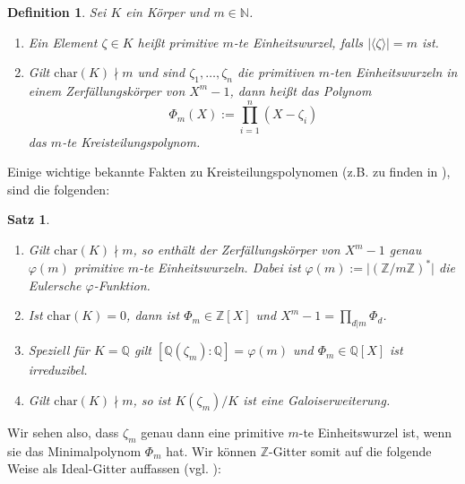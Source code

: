 \documentclass[12pt,a4paper,halfparskip,headsepline,bibtotocnumbered]{scrreprt}
\theoremstyle{nummermitklammern}
\newtheorem{definition}[defsatzusw]{Definition}
\newtheorem{satz}[defsatzusw]{Satz}
\theoremstyle{nonumberbreak}
\newcommand{\N}{\mathbb{N}}
\newcommand{\Z}{\mathbb{Z}}
\newcommand{\Q}{\mathbb{Q}}
\begin{document}
\begin{framed}
	\begin{definition}
		Sei $K$ ein Körper und $m \in \N$. 
		\begin{enumerate}
			\item Ein Element $\zeta \in K$ heißt primitive $m$-te Einheitswurzel, falls $\vert \langle \zeta \rangle \vert = m$ ist.
			\item Gilt $\text{char}(K) \nmid m$ und sind $\zeta_1, \dots, \zeta_n$ die primitiven $m$-ten Einheitswurzeln in einem Zerfällungskörper von $X^m - 1$, dann heißt das Polynom
				\begin{equation*}
					\Phi_m(X) := \prod_{i=1}^n (X - \zeta_i)
				\end{equation*}
				das \textit{$m$-te Kreisteilungspolynom}.
		\end{enumerate}
	\end{definition}
\end{framed}

Einige wichtige bekannte Fakten zu Kreisteilungspolynomen (z.B. zu finden in \cite[Kap. 1]{Mollin}), sind die folgenden:

\begin{framed}
	\begin{satz}\label{th:cycpol}
		\begin{enumerate}[label=(\roman*)]
			\item Gilt $\text{char}(K) \nmid m$, so enthält der Zerfällungskörper von $X^m-1$ genau $\varphi(m)$ primitive $m$-te Einheitswurzeln. Dabei ist $\varphi(m) := \vert \left( \Z / m \Z \right)^\ast \vert$ die \textit{Eulersche $\varphi$-Funktion}.
			\item Ist $\text{char}(K) = 0$, dann ist $\Phi_m \in \Z \left[ X \right]$ und $X^m-1 = \prod_{d \vert m} \Phi_d$.
			\item Speziell für $K = \Q$ gilt $\left[ \Q \left( \zeta_m \right) : \Q \right] = \varphi (m)$ und $\Phi_m \in \Q \left[ X \right]$ ist irreduzibel.
			\item Gilt $\text{char}(K) \nmid m$, so ist $K(\zeta_m) / K$ ist eine Galoiserweiterung.
		\end{enumerate}
	\end{satz}
\end{framed}

Wir sehen also, dass $\zeta_m$ genau dann eine primitive $m$-te Einheitswurzel ist, wenn sie das Minimalpolynom $\Phi_m$ hat. Wir können $\Z$-Gitter somit auf die folgende Weise als Ideal-Gitter auffassen (vgl. \cite[Abschnitt (5.2)]{nebe}):
\end{document}
